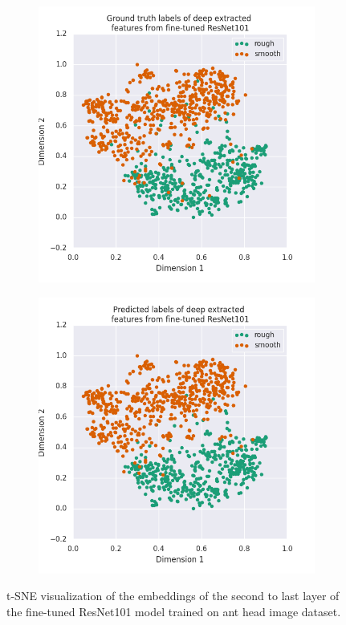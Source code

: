 \documentclass{aci}
\numberwithin{equation}{section}
\begin{document}
\begin{figure}[h]
    \centering
    \begin{subfigure}{.45\textwidth}
        \includegraphics[width=1\linewidth]{thesis_assets/plots/fresnet101_gt_tsne.png}
    \end{subfigure}
    \begin{subfigure}{.45\textwidth}
        \includegraphics[width=1\linewidth]{thesis_assets/plots/fresnet101_pred_tsne.png}
    \end{subfigure}
    \caption{t-SNE visualization of the embeddings of the second to last layer
        of the fine-tuned ResNet101 model trained on ant head image dataset.}
    \label{fig:fresnet101_tsne}
\end{figure}
\end{document}
